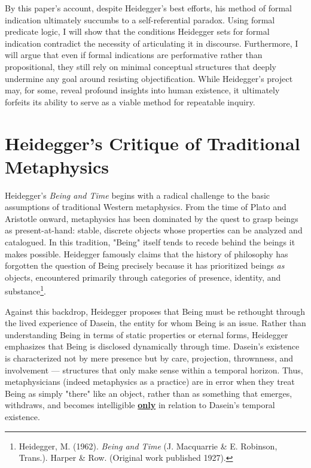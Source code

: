 \documentclass{article}
\begin{document}
By this paper's account, despite Heidegger's best efforts, his method of formal indication ultimately succumbs to a self-referential paradox. Using formal predicate logic, I will show that the conditions Heidegger sets for formal indication contradict the necessity of articulating it in discourse. Furthermore, I will argue that even if formal indications are performative rather than propositional, they still rely on minimal conceptual structures that deeply undermine any goal around resisting objectification. While Heidegger's project may, for some, reveal profound insights into human existence, it ultimately forfeits its ability to serve as a viable method for repeatable inquiry.

\section*{Heidegger's Critique of Traditional Metaphysics}

Heidegger's \textit{Being and Time} begins with a radical challenge to the basic assumptions of traditional Western metaphysics. From the time of Plato and Aristotle onward, metaphysics has been dominated by the quest to grasp beings as present-at-hand: stable, discrete objects whose properties can be analyzed and catalogued. In this tradition, "Being" itself tends to recede behind the beings it makes possible. Heidegger famously claims that the history of philosophy has forgotten the question of Being precisely because it has prioritized beings \textit{as} objects, encountered primarily through categories of presence, identity, and substance\footnote{Heidegger, M. (1962). \textit{Being and Time} (J. Macquarrie \& E. Robinson, Trans.). Harper \& Row. (Original work published 1927).}.

Against this backdrop, Heidegger proposes that Being must be rethought through the lived experience of Dasein, the entity for whom Being is an issue. Rather than understanding Being in terms of static properties or eternal forms, Heidegger emphasizes that Being is disclosed dynamically through time. Dasein's existence is characterized not by mere presence but by care, projection, thrownness, and involvement --- structures that only make sense within a temporal horizon. Thus, metaphysicians (indeed metaphysics as a practice) are in error when they treat Being as simply "there" like an object, rather than as something that emerges, withdraws, and becomes intelligible \underline{\textbf{only}} in relation to Dasein's temporal existence.
\end{document}
